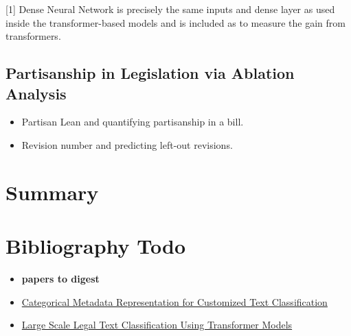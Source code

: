 \documentclass[11pt]{article}
\begin{document}
\vspace{3mm}

[1] Dense Neural Network is precisely the same inputs and dense layer as used inside the transformer-based models and is 
included as to measure the gain from transformers. 

\subsection{Partisanship in Legislation via Ablation Analysis}

\begin{itemize}
  \item Partisan Lean and quantifying partisanship in a bill.
  \item Revision number and predicting left-out revisions.
\end{itemize}

\section{Summary}




\section{Bibliography Todo}

\begin{itemize}
  \item \textbf{papers to digest}
  \item \href{https://transacl.org/ojs/index.php/tacl/article/view/1619}{Categorical Metadata Representation for Customized Text Classification}
  \item \href{https://arxiv.org/abs/2010.12871}{Large Scale Legal Text Classification Using Transformer Models}
\end{itemize}




\end{document}
